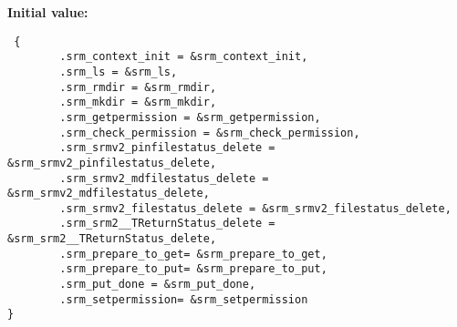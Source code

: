\textbf{Initial value:}

\begin{Code}\begin{verbatim} { 
        .srm_context_init = &srm_context_init,
        .srm_ls = &srm_ls,
        .srm_rmdir = &srm_rmdir,
        .srm_mkdir = &srm_mkdir,
        .srm_getpermission = &srm_getpermission,
        .srm_check_permission = &srm_check_permission,
        .srm_srmv2_pinfilestatus_delete = &srm_srmv2_pinfilestatus_delete,
        .srm_srmv2_mdfilestatus_delete = &srm_srmv2_mdfilestatus_delete,
        .srm_srmv2_filestatus_delete = &srm_srmv2_filestatus_delete,
        .srm_srm2__TReturnStatus_delete = &srm_srm2__TReturnStatus_delete,
        .srm_prepare_to_get= &srm_prepare_to_get,
        .srm_prepare_to_put= &srm_prepare_to_put,
        .srm_put_done = &srm_put_done,
        .srm_setpermission= &srm_setpermission
}
\end{verbatim}\end{Code}
